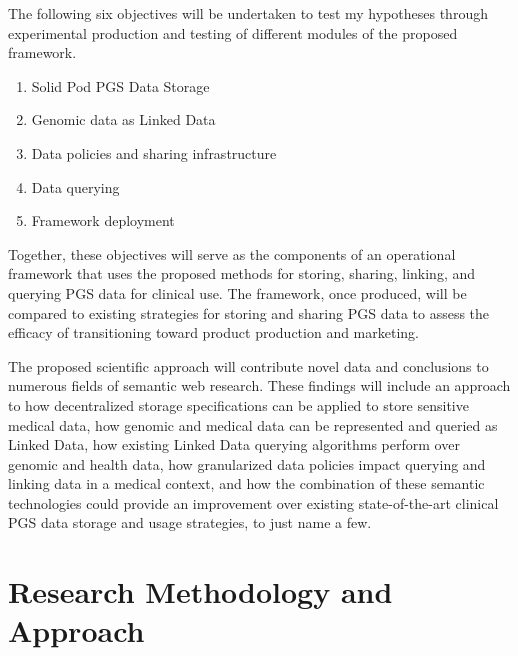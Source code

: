 \documentclass[runningheads]{llncs}
\begin{document}
The following six objectives will be undertaken to test my hypotheses through experimental production and testing of different modules of the proposed framework.
\begin{enumerate}
    \item Solid Pod PGS Data Storage
    \item Genomic data as Linked Data
    \item Data policies and sharing infrastructure
    \item Data querying
    \item Framework deployment
\end{enumerate}

Together, these objectives will serve as the components of an operational framework that uses the proposed methods for storing, sharing, linking, and querying PGS data for clinical use. The framework, once produced, will be compared to existing strategies for storing and sharing PGS data to assess the efficacy of transitioning toward product production and marketing.

The proposed scientific approach will contribute novel data and conclusions to numerous fields of semantic web research. These findings will include an approach to how decentralized storage specifications can be applied to store sensitive medical data, how genomic and medical data can be represented and queried as Linked Data, how existing Linked Data querying algorithms perform over genomic and health data, how granularized data policies impact querying and linking data in a medical context, and how the combination of these semantic technologies could provide an improvement over existing state-of-the-art clinical PGS data storage and usage strategies, to just name a few.


\section{Research Methodology and Approach}

\end{document}
